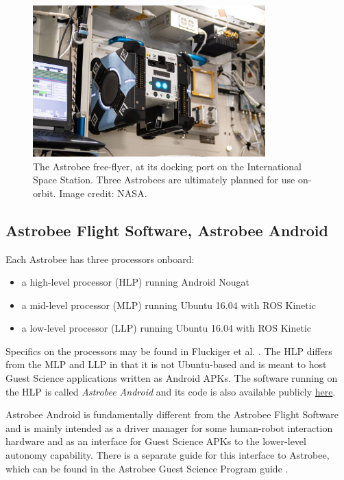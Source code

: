 \documentclass{article}
\begin{document}
\begin{figure}[h!]
    \centering
    \includegraphics[width=0.8\textwidth]{img/nasa_astrobee.jpeg}
    \caption{The Astrobee free-flyer, at its docking port on the International Space Station. Three Astrobees are ultimately planned for use on-orbit. Image credit: NASA.}
    \label{fig:astro}
\end{figure}


\subsection{Astrobee Flight Software, Astrobee Android}

Each Astrobee has three processors onboard:
\begin{itemize}
    \item a high-level processor (HLP) running Android Nougat
    \item a mid-level processor (MLP) running Ubuntu 16.04 with ROS Kinetic
    \item a low-level processor (LLP) running Ubuntu 16.04 with ROS Kinetic
\end{itemize}

Specifics on the processors may be found in Fluckiger et al. \cite{Fluckiger}. The HLP differs from the MLP and LLP in that it is not Ubuntu-based and is meant to host Guest Science applications written as Android APKs. The software running on the HLP is called \textit{Astrobee Android} and its code is also available publicly \href{https://github.com/nasa/astrobee\_android}{here}.

Astrobee Android is fundamentally different from the Astrobee Flight Software and is mainly intended as a driver manager for some human-robot interaction hardware and as an interface for Guest Science APKs to the lower-level autonomy capability. There is a separate guide for this interface to Astrobee, which can be found in the Astrobee Guest Science Program guide \cite{NASAAmesResearchCenter2017a}.
\end{document}
